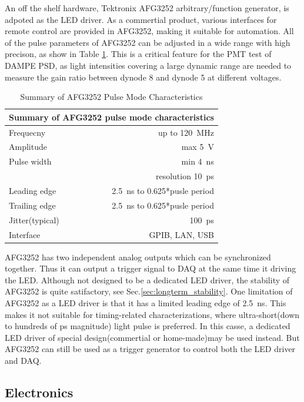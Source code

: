 \documentclass[5p, times]{elsarticle}
\begin{document}
An off the shelf hardware, Tektronix AFG3252 arbitrary/function generator, is adpoted as the LED driver.
As a commertial product, various interfaces for remote control are provided in AFG3252, making it suitable for automation.
All of the pulse parameters of AFG3252 can be adjusted in a wide range with high precison, as show in Table \ref{tab:afg3252}.
This is a critical feature for the PMT test of DAMPE PSD, as light intensities covering a large dynamic range are needed to measure the gain ratio between dynode 8 and dynode 5 at different voltages.
\begin{table}[h!]
\caption{Summary of AFG3252 Pulse Mode Characteristics}
\label{tab:afg3252}
 \begin{center}
 \begin{tabular}{lr}
 \multicolumn{2}{l}{Summary of AFG3252 pulse mode characteristics}\\ \hline
 Frequecny & up to \SI{120}{\MHz} \\
 Amplitude & max \SI{5}{\volt} \\
 Pulse width & min \SI{4}{\nano\second} \\
             & resolution \SI{10}{\pico\second} \\
 Leading edge & \SI{2.5}{\nano\second} to 0.625*pusle period \\
 Trailing edge & \SI{2.5}{\nano\second} to 0.625*pusle period \\
 Jitter(typical) & \SI{100}{\pico\second} \\
 Interface     & GPIB, LAN, USB
 \end{tabular}
 \end{center}
\end{table} 
AFG3252 has two independent analog outputs which can be synchronized together.
Thus it can output a trigger signal to DAQ at the same time it driving the LED. 
Although not designed to be a dedicated LED driver, the stability of AFG3252 is quite satifactory, see Sec.\ref{sec:longterm_stability}.
One limitation of AFG3252 as a LED driver is that it has a limited leading edge of \SI{2.5}{ns}.
This makes it not suitable for timing-related characterizations, where ultra-short(down to hundreds of \si{\pico\second} magnitude) light pulse is preferred.
In this casse, a dedicated LED driver of special design(commertial or home-made)may be used instead.
But AFG3252 can still be used as a trigger generator to control both the LED driver and DAQ.

\subsection{Electronics}
\label{sec:electronics}
\end{document}
